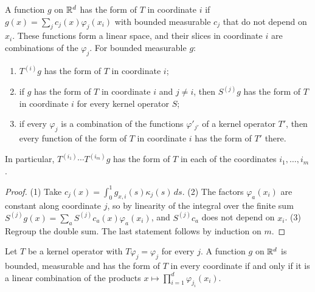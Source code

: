 \begin{lemma}
\label{lem:kernel-forms}
\leanok
{}
A function $g$ on $\mathbb{R}^d$ has the form of $T$ in coordinate $i$ if
$g(x) = \sum_j c_j(x) \varphi_j(x_i)$ with bounded measurable $c_j$ that do not depend on $x_i$.
These functions form a linear space, and their slices in coordinate $i$ are combinations of the
$\varphi_j$. For bounded measurable $g$:
\begin{enumerate}
  \item $T^{(i)} g$ has the form of $T$ in coordinate $i$;
  \item if $g$ has the form of $T$ in coordinate $i$ and $j \neq i$, then $S^{(j)} g$ has the form
    of $T$ in coordinate $i$ for every kernel operator $S$;
  \item if every $\varphi_j$ is a combination of the functions $\varphi'_{j'}$ of a kernel operator
    $T'$, then every function of the form of $T$ in coordinate $i$ has the form of $T'$ there.
\end{enumerate}
In particular, $T^{(i_1)} \cdots T^{(i_m)} g$ has the form of $T$ in each of the coordinates
$i_1, \dots, i_m$.
\end{lemma}

\begin{proof}
\leanok
(1) Take $c_j(x) = \int_0^1 g_{x,i}(s) \kappa_j(s) \, ds$. (2) The factors $\varphi_a(x_i)$ are
constant along coordinate $j$, so by linearity of the integral over the finite sum
$S^{(j)} g(x) = \sum_a S^{(j)} c_a(x) \varphi_a(x_i)$, and $S^{(j)} c_a$ does not depend on $x_i$.
(3) Regroup the double sum. The last statement follows by induction on $m$.
\end{proof}

\begin{lemma}
\label{lem:kernel-tensor}
\leanok
{}
Let $T$ be a kernel operator with $T \varphi_j = \varphi_j$ for every $j$. A function $g$ on $\mathbb{R}^d$
is bounded, measurable and has the form of $T$ in every coordinate if and only if it is a linear
combination of the products $x \mapsto \prod_{i=1}^d \varphi_{j_i}(x_i)$.
\end{lemma}

